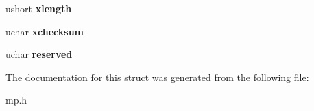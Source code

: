 \begin{DoxyCompactItemize}
\item 
ushort {\bfseries xlength}\hypertarget{structmpconf_adbda8ec5a43970662e7eab8f8da11817}{}\label{structmpconf_adbda8ec5a43970662e7eab8f8da11817}

\item 
uchar {\bfseries xchecksum}\hypertarget{structmpconf_a499447fb50cb158a848f66f124dd8f8d}{}\label{structmpconf_a499447fb50cb158a848f66f124dd8f8d}

\item 
uchar {\bfseries reserved}\hypertarget{structmpconf_ab7ce4c5b90a538f41baefef6714d1a23}{}\label{structmpconf_ab7ce4c5b90a538f41baefef6714d1a23}

\end{DoxyCompactItemize}


The documentation for this struct was generated from the following file\+:\begin{DoxyCompactItemize}
\item 
mp.\+h\end{DoxyCompactItemize}
